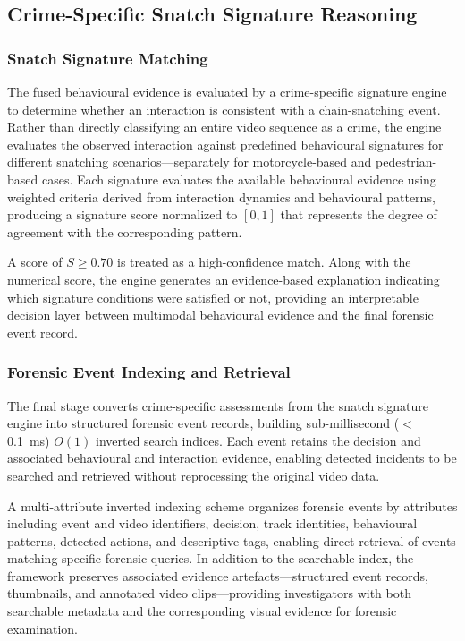 \documentclass[runningheads]{llncs}
\begin{document}
\subsection{Crime-Specific Snatch Signature Reasoning}
\subsubsection{Snatch Signature Matching}
The fused behavioural evidence is evaluated by a crime-specific
signature engine to determine whether an interaction is consistent with
a chain-snatching event. Rather than directly classifying an entire
video sequence as a crime, the engine evaluates the observed interaction
against predefined behavioural signatures for different snatching
scenarios—separately for motorcycle-based and pedestrian-based cases.
Each signature evaluates the available behavioural evidence using
weighted criteria derived from interaction dynamics and behavioural
patterns, producing a signature score normalized to $[0,1]$ that
represents the degree of agreement with the corresponding pattern.

A score of $S \geq 0.70$ is treated as a high-confidence match. Along
with the numerical score, the engine generates an evidence-based
explanation indicating which signature conditions were satisfied or
not, providing an interpretable decision layer between multimodal
behavioural evidence and the final forensic event record.

\subsubsection{Forensic Event Indexing and Retrieval}
The final stage converts crime-specific assessments from the snatch
signature engine into structured forensic event records, building
sub-millisecond ($<$0.1~ms) $O(1)$ inverted search indices. Each event
retains the decision and associated behavioural and interaction
evidence, enabling detected incidents to be searched and retrieved
without reprocessing the original video data.

A multi-attribute inverted indexing scheme organizes forensic events by
attributes including event and video identifiers, decision, track
identities, behavioural patterns, detected actions, and descriptive
tags, enabling direct retrieval of events matching specific forensic
queries. In addition to the searchable index, the framework preserves
associated evidence artefacts—structured event records, thumbnails, and
annotated video clips—providing investigators with both searchable
metadata and the corresponding visual evidence for forensic examination.
\end{document}
